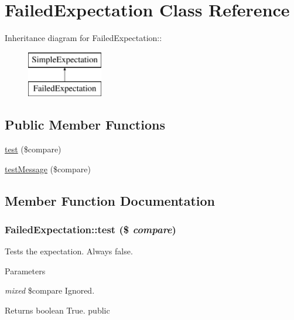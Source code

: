 \hypertarget{class_failed_expectation}{
\section{FailedExpectation Class Reference}
\label{class_failed_expectation}
}
Inheritance diagram for FailedExpectation::\begin{figure}[H]
\begin{center}
\leavevmode
\includegraphics[height=2cm]{class_failed_expectation}
\end{center}
\end{figure}
\subsection*{Public Member Functions}
\begin{DoxyCompactItemize}
\item 
\hyperlink{class_failed_expectation_a01fe75b5ab2a291476d724f909c43ef2}{test} (\$compare)
\item 
\hyperlink{class_failed_expectation_af16f47796c075ab58563a59002340614}{testMessage} (\$compare)
\end{DoxyCompactItemize}


\subsection{Member Function Documentation}
\hypertarget{class_failed_expectation_a01fe75b5ab2a291476d724f909c43ef2}{
\subsubsection[{test}]{\setlength{\rightskip}{0pt plus 5cm}FailedExpectation::test (\$ {\em compare})}}
\label{class_failed_expectation_a01fe75b5ab2a291476d724f909c43ef2}
Tests the expectation. Always false. 
\begin{DoxyParams}{Parameters}
\item[{\em mixed}]\$compare Ignored. \end{DoxyParams}
\begin{DoxyReturn}{Returns}
boolean True.  public 
\end{DoxyReturn}


